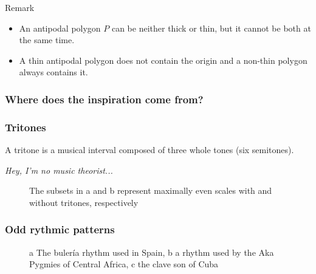 \documentclass{beamer}
\begin{document}
\begin{frame}
\begin{block}{Remark}
\begin{itemize}
\item<1-> An antipodal polygon $P$ can be neither thick or thin, but it cannot be both at the same time. 
\item<2-> A thin antipodal polygon does not contain the origin and a non-thin polygon always contains it.
\end{itemize}
\end{block}\pause


\end{frame}

\begin{frame}


\frametitle{Where does the inspiration come from?}
\end{frame}

\begin{frame}
\frametitle{Tritones}
A tritone is a musical interval
composed of three whole tones (six semitones).\pause
\vspace{1cm}

\emph{Hey, I'm no music theorist...}


\end{frame}
\begin{frame}
\begin{figure}[h!]
\centering
\caption{The subsets in a and b represent maximally even scales with and without tritones, respectively}
\end{figure}
\end{frame}


\begin{frame}
\frametitle{Odd rythmic patterns}
\begin{figure}
\caption{a The bulería rhythm used in Spain, b a rhythm used by the Aka Pygmies of Central Africa, c the
clave son of Cuba}
\end{figure}
\end{frame}
\end{document}
